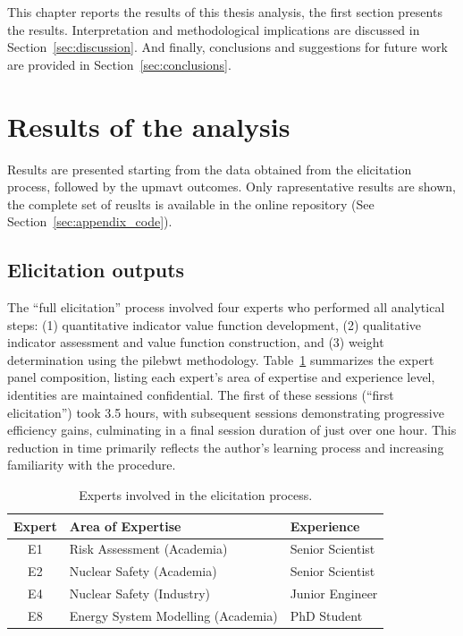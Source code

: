 This chapter reports the results of this thesis analysis, the first section presents the results. Interpretation and methodological implications are discussed in Section~\ref{sec:discussion}. And finally, conclusions and suggestions for future work are provided in Section~\ref{sec:conclusions}.

\section{Results of the analysis}
\label{sec:results}
Results are presented starting from the data obtained from the elicitation process, followed by the \gls{upmavt} outcomes. Only rapresentative results are shown, the complete set of reuslts is available in the online repository (See Section~\ref{sec:appendix_code}).

\subsection{Elicitation outputs}
\label{sec:elicitation_outputs}
The “full elicitation” process involved four experts who performed all analytical steps: (1) quantitative indicator value function development, (2) qualitative indicator assessment and value function construction, and (3) weight determination using the \gls{pilebwt} methodology. Table~\ref{tab:experts} summarizes the expert panel composition, listing each expert's area of expertise and experience level, identities are maintained confidential. The first of these sessions (“first elicitation”) took 3.5 hours, with subsequent sessions demonstrating progressive efficiency gains, culminating in a final session duration of just over one hour. This reduction in time primarily reflects the author's learning process and increasing familiarity with the procedure.

\begin{table}[htbp]
	\centering
	\begin{tabularx}{\textwidth}{|c|X|X|}
		\hline
			\textbf{Expert} & \textbf{Area of Expertise} & \textbf{Experience}\\
		\hline
		E1 & Risk Assessment (Academia) & Senior Scientist\\
		E2 & Nuclear Safety (Academia) & Senior Scientist\\
		E4 & Nuclear Safety (Industry) & Junior Engineer\\
		E8 & Energy System Modelling (Academia) & PhD Student\\
		\hline
	\end{tabularx}
	\caption{Experts involved in the elicitation process.}
	\label{tab:experts}
\end{table}


